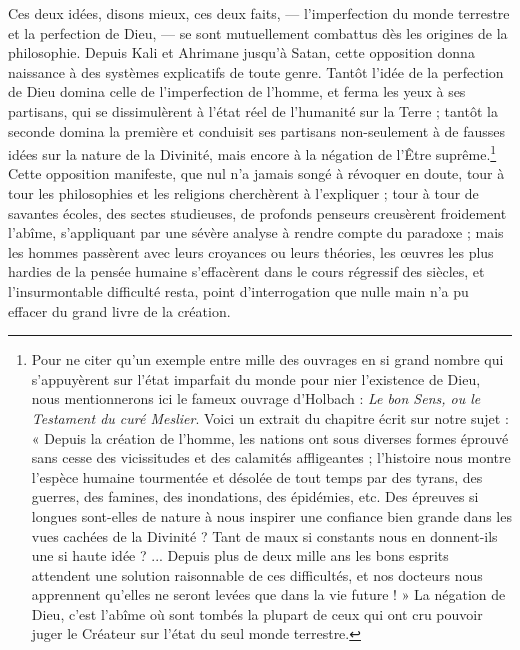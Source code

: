 \documentclass[a4paper, 11pt, oneside]{article}
\begin{document}
Ces deux idées, disons mieux, ces deux faits, --- l'imperfection du monde terrestre et la perfection de Dieu, --- se sont mutuellement combattus dès les origines de la philosophie. Depuis Kali et Ahrimane jusqu'à Satan, cette opposition donna naissance à des systèmes explicatifs de toute genre. Tantôt l'idée de la perfection de Dieu domina celle de l'imperfection de l'homme, et ferma les yeux à ses partisans, qui se dissimulèrent à l'état réel de l'humanité sur la Terre ; tantôt la seconde domina la première et conduisit ses partisans non-seulement à de fausses idées sur la nature de la Divinité, mais encore à la négation de l'Être suprême.\footnote{Pour ne citer qu'un exemple entre mille des ouvrages en si grand nombre qui s'appuyèrent sur l'état imparfait du monde pour nier l'existence de Dieu, nous mentionnerons ici le fameux ouvrage d'Holbach : \emph{Le bon Sens, ou le Testament du curé Meslier}. Voici un extrait du chapitre écrit sur notre sujet : « Depuis la création de l'homme, les nations ont sous diverses formes éprouvé sans cesse des vicissitudes et des calamités affligeantes ; l'histoire nous montre l'espèce humaine tourmentée et désolée de tout temps par des tyrans, des guerres, des famines, des inondations, des épidémies, etc. Des épreuves si longues sont-elles de nature à nous inspirer une confiance bien grande dans les vues cachées de la Divinité ? Tant de maux si constants nous en donnent-ils une si haute idée ? ... Depuis plus de deux mille ans les bons esprits attendent une solution raisonnable de ces difficultés, et nos docteurs nous apprennent qu'elles ne seront levées que dans la vie future ! » La négation de Dieu, c'est l'abîme où sont tombés la plupart de ceux qui ont cru pouvoir juger le Créateur sur l'état du seul monde terrestre.} Cette opposition manifeste, que nul n'a jamais songé à révoquer en doute, tour à tour les philosophies et les religions cherchèrent à l'expliquer ; tour à tour de savantes écoles, des sectes studieuses, de profonds penseurs creusèrent froidement l'abîme, s'appliquant par une sévère analyse à rendre compte du paradoxe ; mais les hommes passèrent avec leurs croyances ou leurs théories, les œuvres les plus hardies de la pensée humaine s'effacèrent dans le cours régressif des siècles, et l'insurmontable difficulté resta, point d'interrogation que nulle main n'a pu effacer du grand livre de la création.
\end{document}
